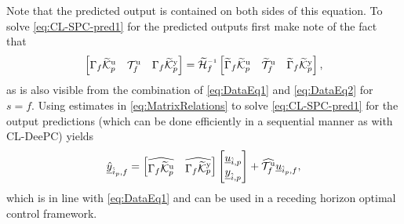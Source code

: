 Note that the predicted output is contained on both sides of this equation. To solve \eqref{eq:CL-SPC-pred1} for the predicted outputs first make note of the fact that~\citep{Houtzager2012}
\begin{align}\label{eq:MatrixRelations}
	\begin{bmatrix}
		\Gamma_f\tKp{u} & \mathcal{T}_f^\mathrm{u} & \Gamma_f\tKp{y}
	\end{bmatrix}=
        \tHf\inv\begin{bmatrix}
		\widetilde{\Gamma}_f\tKp{u} & \widetilde{\mathcal{T}}_f^\mathrm{u} & \widetilde{\Gamma}_f\tKp{y}
	\end{bmatrix},
\end{align}
as is also visible from the combination of \eqref{eq:DataEq1} and \eqref{eq:DataEq2} for $s=f$. Using estimates in \eqref{eq:MatrixRelations} to solve \eqref{eq:CL-SPC-pred1} for the output predictions (which can be done efficiently in a sequential manner as with \ac{CL-DeePC}) yields
\begin{align}\label{eq:CL-SPC-pred2}
		\underline{\hat{y}}_{\hat{i}_p,f}= \begin{bmatrix}\widehat{\Gamma_f\widetilde{\mathcal{K}}_{p}^{\mathrm{{u}}}} & \widehat{\Gamma_f\widetilde{\mathcal{K}}_{p}^{\mathrm{{y}}}} \end{bmatrix} 
		\begin{bmatrix}
			\underline{u}_{\hat{i},p}\\
			\underline{y}_{\hat{i},p}
		\end{bmatrix}+
		\widehat{\mathcal{T}_f^\mathrm{u}} 
		\underline{u}_{\hat{i}_p,f},
\end{align}
which is in line with \eqref{eq:DataEq1} and can be used in a receding horizon optimal control framework.

